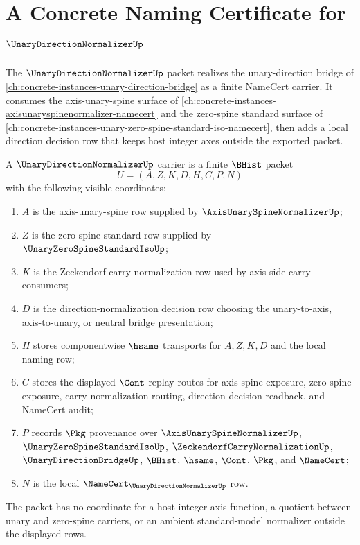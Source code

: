 \chapter{A Concrete Naming Certificate for $\UnaryDirectionNormalizerUp$}
\label{ch:concrete-instances-unarydirectionnormalizer-namecert}

The $\UnaryDirectionNormalizerUp$ packet realizes the unary-direction bridge of \autoref{ch:concrete-instances-unary-direction-bridge} as a finite NameCert carrier. It consumes the axis-unary-spine surface of \autoref{ch:concrete-instances-axisunaryspinenormalizer-namecert} and the zero-spine standard surface of \autoref{ch:concrete-instances-unary-zero-spine-standard-iso-namecert}, then adds a local direction decision row that keeps host integer axes outside the exported packet.

\begin{definition}
\label{def:unary-direction-normalizer-carrier}
A $\UnaryDirectionNormalizerUp$ carrier is a finite $\BHist$ packet
$$
U=(A,Z,K,D,H,C,P,N)
$$
with the following visible coordinates:
\begin{enumerate}
\item $A$ is the axis-unary-spine row supplied by $\AxisUnarySpineNormalizerUp$;
\item $Z$ is the zero-spine standard row supplied by $\UnaryZeroSpineStandardIsoUp$;
\item $K$ is the Zeckendorf carry-normalization row used by axis-side carry consumers;
\item $D$ is the direction-normalization decision row choosing the unary-to-axis, axis-to-unary, or neutral bridge presentation;
\item $H$ stores componentwise $\hsame$ transports for $A,Z,K,D$ and the local naming row;
\item $C$ stores the displayed $\Cont$ replay routes for axis-spine exposure, zero-spine exposure, carry-normalization routing, direction-decision readback, and NameCert audit;
\item $P$ records $\Pkg$ provenance over $\AxisUnarySpineNormalizerUp$, $\UnaryZeroSpineStandardIsoUp$, $\ZeckendorfCarryNormalizationUp$, $\UnaryDirectionBridgeUp$, $\BHist$, $\hsame$, $\Cont$, $\Pkg$, and $\NameCert$;
\item $N$ is the local $\NameCert_{\UnaryDirectionNormalizerUp}$ row.
\end{enumerate}
The packet has no coordinate for a host integer-axis function, a quotient between unary and zero-spine carriers, or an ambient standard-model normalizer outside the displayed rows.
\end{definition}

